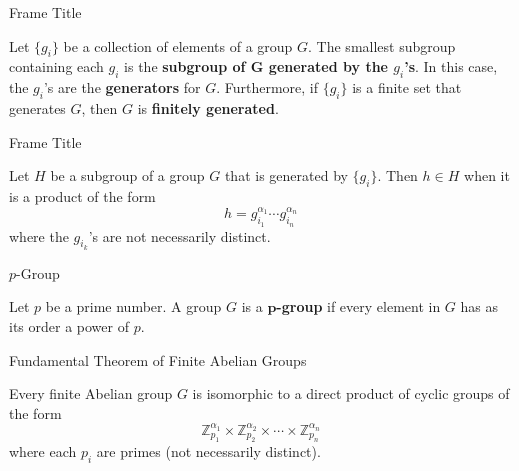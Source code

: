 \documentclass{beamer}
\begin{document}
\begin{frame}{Frame Title}
    \begin{definition}
        \justifying
        Let $\{g_i\}$ be a collection of elements of a group $G$. The smallest subgroup containing each $g_i$ is the \textbf{subgroup of $\boldsymbol{G}$ generated by the $g_i$'s}. In this case, the $g_i$'s are the \textbf{generators} for $G$. Furthermore, if $\{g_i\}$ is a finite set that generates $G$, then $G$ is \textbf{finitely generated}.  
    \end{definition}
\end{frame}

\begin{frame}{Frame Title}
    \begin{theorem}
        \justifying
        Let $H$ be a subgroup of a group $G$ that is generated by $\{g_i\}$. Then $h \in H$ when it is a product of the form
        \[h = g_{i_1}^{\alpha_1}\cdots g_{i_n}^{\alpha_n}\]
        where the $g_{i_k}$'s are not necessarily distinct.
    \end{theorem}
\end{frame}

\begin{frame}{$p$-Group}
    \begin{definition}
        \justifying
        Let $p$ be a prime number. A group $G$ is a \textbf{$\boldsymbol{p}$-group} if every element in $G$ has as its order a power of $p$.
    \end{definition}
\end{frame}

\begin{frame}{Fundamental Theorem of Finite Abelian Groups}
    \begin{theorem}
        \justifying
        Every finite Abelian group $G$ is isomorphic to a direct product of cyclic groups of the form
        \[\mathbb{Z}_{p_1}^{\alpha_1} \times \mathbb{Z}_{p_2}^{\alpha_2} \times \cdots \times \mathbb{Z}_{p_n}^{\alpha_n}\]
        where each $p_i$ are primes (not necessarily distinct).
    \end{theorem}
\end{frame}
\end{document}
